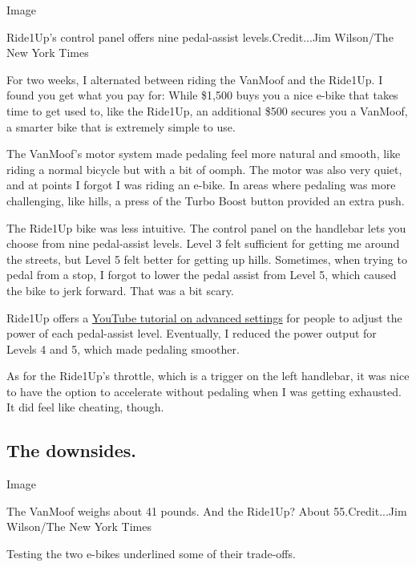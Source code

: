 Image

Ride1Up's control panel offers nine pedal-assist levels.Credit...Jim
Wilson/The New York Times

For two weeks, I alternated between riding the VanMoof and the Ride1Up.
I found you get what you pay for: While \$1,500 buys you a nice e-bike
that takes time to get used to, like the Ride1Up, an additional \$500
secures you a VanMoof, a smarter bike that is extremely simple to use.

The VanMoof's motor system made pedaling feel more natural and smooth,
like riding a normal bicycle but with a bit of oomph. The motor was also
very quiet, and at points I forgot I was riding an e-bike. In areas
where pedaling was more challenging, like hills, a press of the Turbo
Boost button provided an extra push.

The Ride1Up bike was less intuitive. The control panel on the handlebar
lets you choose from nine pedal-assist levels. Level 3 felt sufficient
for getting me around the streets, but Level 5 felt better for getting
up hills. Sometimes, when trying to pedal from a stop, I forgot to lower
the pedal assist from Level 5, which caused the bike to jerk forward.
That was a bit scary.

Ride1Up offers a
\href{https://www.youtube.com/watch?v=12ifbdLegvw}{YouTube tutorial on
advanced settings} for people to adjust the power of each pedal-assist
level. Eventually, I reduced the power output for Levels 4 and 5, which
made pedaling smoother.

As for the Ride1Up's throttle, which is a trigger on the left handlebar,
it was nice to have the option to accelerate without pedaling when I was
getting exhausted. It did feel like cheating, though.

\hypertarget{the-downsides}{%
\subsection{The downsides.}\label{the-downsides}}

Image

The VanMoof weighs about 41 pounds. And the Ride1Up? About
55.Credit...Jim Wilson/The New York Times

Testing the two e-bikes underlined some of their trade-offs.

